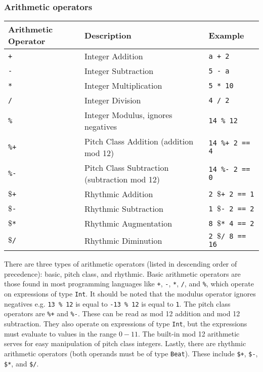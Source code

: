 \subsubsection{Arithmetic operators}

\begin{table} [H]
\centering
\begin{tabularx}{\textwidth}{lXX}
\hline\hline
Arithmetic Operator & Description & Example \\
\hline\hline
  \texttt{+} & Integer Addition  & \texttt{a + 2} \\ \hline
  \texttt{-} & Integer Subtraction  & \texttt{5 - a} \\ \hline 
  \texttt{*} & Integer Multiplication  & \texttt{5 * 10} \\ \hline 
  \texttt{/} & Integer Division  & \texttt{4 / 2} \\ \hline 
  \texttt{\%} & Integer Modulus, ignores negatives  & \texttt{14 \% 12} \\ \hline
  \texttt{\%+} & Pitch Class Addition (addition mod 12)  & \texttt{14 \%+ 2 == 4 }\\ \hline
  \texttt{\%-} & Pitch Class Subtraction (subtraction mod 12)  & \texttt{14 \%- 2 == 0 } \\ \hline
  \texttt{$\$$+} & Rhythmic Addition & \texttt{2 $\$$+ 2 == 1} \\ \hline
  \texttt{$\$$-} & Rhythmic Subtraction & \texttt{1 $\$$- 2 == 2}  \\ \hline
  \texttt{$\$$*} & Rhythmic Augmentation & \texttt{8 $\$$* 4 == 2}  \\ \hline
  \texttt{$\$$/} & Rhythmic Diminution & \texttt{2 $\$$/ 8 == 16}  \\ \hline
\end{tabularx}
\end{table}

There are three types of arithmetic operators (listed in descending order of precedence):
basic, pitch class, and rhythmic. 
Basic arithmetic operators are those found in most programming languages like 
\texttt{+}, \texttt{-}, \texttt{*}, \texttt{/}, and \texttt{\%}, which operate on expressions of
type \texttt{Int}. It should be noted that the modulus operator ignores negatives e.g.
\texttt{13 \% 12} is equal to \texttt{-13 \% 12} is equal to \texttt{1}.
The pitch class operators are \texttt{\%+} and \texttt{\%-}. These can be read as mod 12 addition
and mod 12 subtraction. They also operate on expressions of type \texttt{Int}, but the expressions
must evaluate to values in the range $0-11$. The built-in mod 12
arithmetic serves for easy manipulation of pitch class integers.
Lastly, there are rhythmic arithmetic operators (both operands must be of type \texttt{Beat}). 
These include \texttt{\$+}, \texttt{\$-}, \texttt{\$*}, and \texttt{\$/}. 

